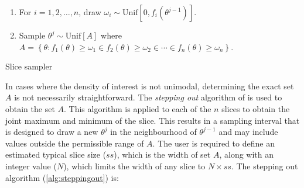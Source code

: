 \documentclass[article]{jss}
\begin{document}
%
\begin{algorithm}[H]
\begin{enumerate}
\item For $i=1,2,\dots,n$, draw $\omega_{i}\sim\mbox{Unif}[0,f_{i}(\theta^{j-1})]$. 
\item Sample $\theta^{j}\sim\mbox{Unif}[A]$ where $A=\left\{ \theta:f_{1}(\theta)\ge\omega_{1}\in f_{2}(\theta)\ge\omega_{2}\in\cdots\in f_{n}(\theta)\ge\omega_{n}\right\} $. 
\end{enumerate}
\caption{Slice sampler}
\label{alg:slicesamp}
\end{algorithm}


In cases where the density of interest is not unimodal, determining
the exact set $A$ is not necessarily straightforward. The
\emph{stepping out} algorithm of \citet{Radford2003} is used to obtain
the set $A$.  This algorithm is applied to each of the $n$ slices to
obtain the joint maximum and minimum of the slice. This results in a
sampling interval that is designed to draw a new $\theta^{j}$ in the
neighbourhood of $\theta^{j-1}$ and may include values outside the
permissible range of $A$. The user is required to define an estimated
typical slice size ($ss$), which is the width of set $A$, along with
an integer value ($N$), which limits the width of any slice to $N\times ss$.
The stepping out algorithm (\ref{alg:steppingout}) is:
\end{document}
